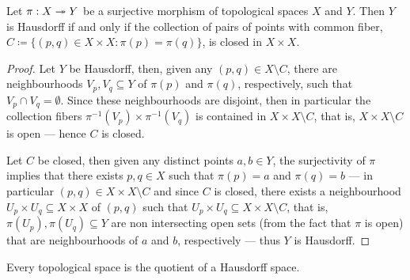 \begin{proposition}
\label{prop:open-quotient-hausdorff}
Let \(\pi: X \twoheadrightarrow Y\) be a surjective morphism of topological spaces \(X\) and
\(Y\). Then \(Y\) is Hausdorff if and only if the collection of pairs of points
with common fiber,
\(C \coloneqq \{(p, q) \in X \times X \colon \pi(p) = \pi(q)\}\), is closed in
\(X \times X\).
\end{proposition}

\begin{proof}
Let \(Y\) be Hausdorff, then, given any \((p, q) \in X \setminus C\), there are
neighbourhoods \(V_p, V_q \subseteq Y\) of \(\pi(p)\) and \(\pi(q)\),
respectively, such that \(V_p \cap V_q = \emptyset\). Since these neighbourhoods
are disjoint, then in particular the collection fibers \(\pi^{-1}(V_p) \times
\pi^{-1}(V_q)\) is contained in \(X \times X \setminus C\), that is, \(X \times
X \setminus C\) is open --- hence \(C\) is closed.

Let \(C\) be closed, then given any distinct points \(a, b \in Y\), the
surjectivity of \(\pi\) implies that there exists \(p, q \in X\) such that
\(\pi(p) = a\) and \(\pi(q) = b\) --- in particular \((p, q) \in X \times X
\setminus C\) and since \(C\) is closed, there exists a neighbourhood \(U_p
\times U_q \subseteq X \times X\) of \((p, q)\) such that \(U_p \times U_q
\subseteq X \times X \setminus C\), that is, \(\pi(U_p), \pi(U_q) \subseteq Y\)
are non intersecting open sets (from the fact that \(\pi\) is open) that are
neighbourhoods of \(a\) and \(b\), respectively --- thus \(Y\) is Hausdorff.
\end{proof}

\begin{proposition}
\label{prop:top-space-is-quotient-of-hausdorff}
Every topological space is the quotient of a Hausdorff space.
\end{proposition}

